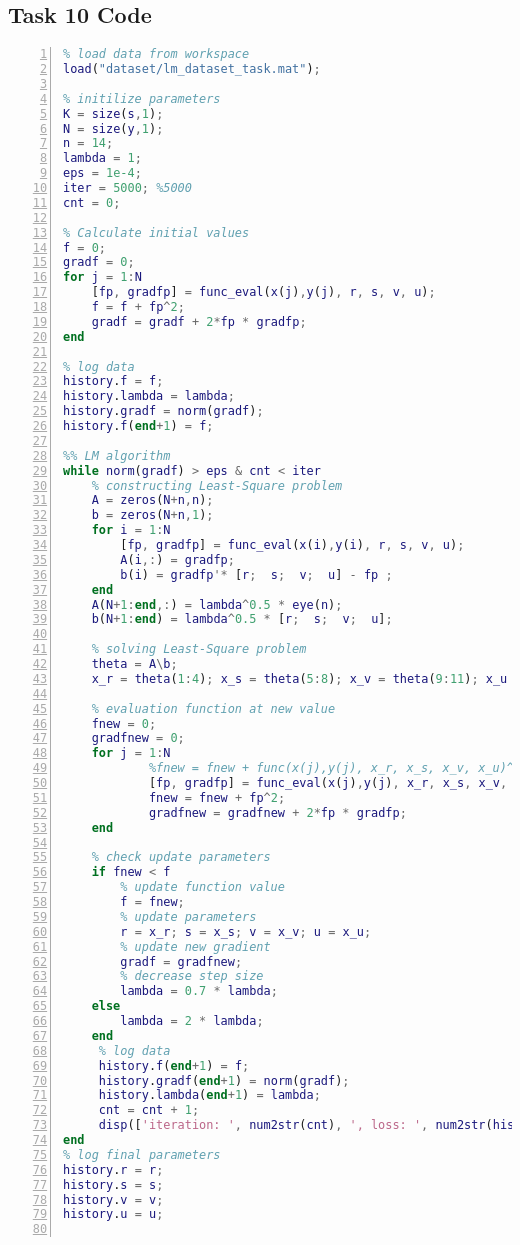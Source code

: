 \documentclass[a4paper,12pt]{report}
\begin{document}
\subsection{Task 10 Code}
\begin{lstlisting}[language=Matlab, style=Matlab-editor, frame=single, numbers=left]
%% setup the data
% load data from workspace
load("dataset/lm_dataset_task.mat");

% initilize parameters
K = size(s,1); 
N = size(y,1);
n = 14;
lambda = 1; 
eps = 1e-4;
iter = 5000; %5000
cnt = 0;
 
% Calculate initial values
f = 0;
gradf = 0;
for j = 1:N 
    [fp, gradfp] = func_eval(x(j),y(j), r, s, v, u);
    f = f + fp^2;
    gradf = gradf + 2*fp * gradfp;       
end

% log data
history.f = f;
history.lambda = lambda;
history.gradf = norm(gradf);
history.f(end+1) = f;

%% LM algorithm 
while norm(gradf) > eps & cnt < iter
    % constructing Least-Square problem
    A = zeros(N+n,n);
    b = zeros(N+n,1);
    for i = 1:N
        [fp, gradfp] = func_eval(x(i),y(i), r, s, v, u);
        A(i,:) = gradfp;
        b(i) = gradfp'* [r;  s;  v;  u] - fp ;
    end
    A(N+1:end,:) = lambda^0.5 * eye(n); 
    b(N+1:end) = lambda^0.5 * [r;  s;  v;  u]; 
    
    % solving Least-Square problem
    theta = A\b;
    x_r = theta(1:4); x_s = theta(5:8); x_v = theta(9:11); x_u = theta(12:14);   

    % evaluation function at new value
    fnew = 0;
    gradfnew = 0;
    for j = 1:N
            %fnew = fnew + func(x(j),y(j), x_r, x_s, x_v, x_u)^2;  
            [fp, gradfp] = func_eval(x(j),y(j), x_r, x_s, x_v, x_u);
            fnew = fnew + fp^2;
            gradfnew = gradfnew + 2*fp * gradfp; 
    end

    % check update parameters
    if fnew < f 
        % update function value 
        f = fnew;
        % update parameters
        r = x_r; s = x_s; v = x_v; u = x_u;        
        % update new gradient
        gradf = gradfnew;      
        % decrease step size        
        lambda = 0.7 * lambda;        
    else
        lambda = 2 * lambda;
    end 
     % log data 
     history.f(end+1) = f; 
     history.gradf(end+1) = norm(gradf);
     history.lambda(end+1) = lambda;
     cnt = cnt + 1;
     disp(['iteration: ', num2str(cnt), ', loss: ', num2str(history.f(end)), ', norm gradient: ', num2str(history.gradf(end))]);
end
% log final parameters
history.r = r;
history.s = s;
history.v = v;
history.u = u;


\end{lstlisting}
\end{document}
